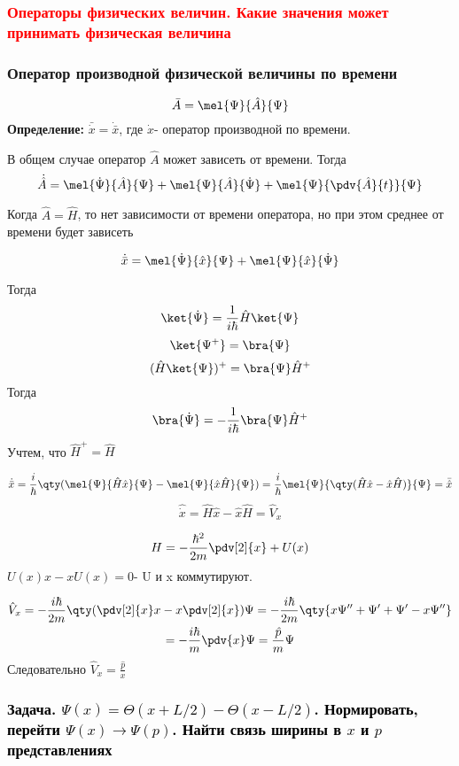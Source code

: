 \subsubsection{\textcolor{red}{Операторы физических величин. Какие значения может принимать физическая величина}}

\subsubsection{{Оператор производной физической величины по времени}}

$$\bar A = \mel{\Psi}{\hat A}{\Psi}$$
\textbf{Определение:} $\bar{\dot x}=\dot{\bar x}$, где $\dot x$- оператор производной по времени. 

В общем случае оператор $\hat A$ может зависеть от времени.
Тогда 
$$\dot{\hat A}= 
\mel{\dot \Psi}{\hat A}{\Psi}+ 
\mel{\Psi}{\hat A}{\dot \Psi}+
\mel{\Psi}{\pdv{\hat A}{t}}{\Psi}$$

Когда $\hat A=\hat H$, то нет зависимости от времени оператора, но при этом среднее от времени будет зависеть

$$\dot{\bar x}=\mel{\dot \Psi}{\hat x}{\Psi}+\mel{\Psi}{\hat x}{\dot \Psi} $$

Тогда $$\ket{\dot \Psi}=\frac{1}{i\hbar}\hat H \ket{\Psi}$$
$$\ket{\Psi^+}=\bra{\Psi} $$
$$(\hat H \ket{\Psi})^+=\bra{\Psi}\hat H^+ $$
Тогда 
$$\bra{\dot\Psi} =-\frac{1}{i\hbar}\bra{\Psi} \hat H^+
$$
Учтем, что $\hat H^+=\hat H$



\begin{gather*}
\dot{\bar x}=\frac{i}{\hbar}\qty(\mel{\Psi}{\hat H \hat x}{\Psi}- \mel{\Psi}{ \hat x \hat H}{\Psi})=\frac{i}{\hbar}\mel{\Psi}{\qty(\hat H \hat x- \hat x \hat H)}{\Psi}=
\bar{\hat x}
\end{gather*}
$$\hat{\dot x}=\hat H \hat x- \hat x \hat H=\hat V_x$$

$$H=-\frac{\hbar^2}{2m}\pdv[2]{x}+U(x)$$
$U(x)x-xU(x)=0$- U и x коммутируют.

\begin{gather*}
	\hat V_x=-\frac{i\hbar}{2m}\qty(\pdv[2]{x} x - x\pdv[2]{x})\Psi=-\frac{i\hbar}{2m}
	\qty{x\Psi'' +\Psi'+\Psi'-x\Psi '' }\\=-\frac{i\hbar}{m}\pdv{x}\Psi=\frac{\hat p}{m}\Psi
\end{gather*}
Следовательно $\hat V_x=\frac{\hat p}{x}$

\subsubsection{\textcolor{black}{Задача. $\Psi(x)=\Theta(x+L/2)-\Theta(x-L/2)$. Нормировать, перейти $\Psi(x)\to\Psi(p)$. Найти связь ширины в $x$ и $p$ представлениях}}

